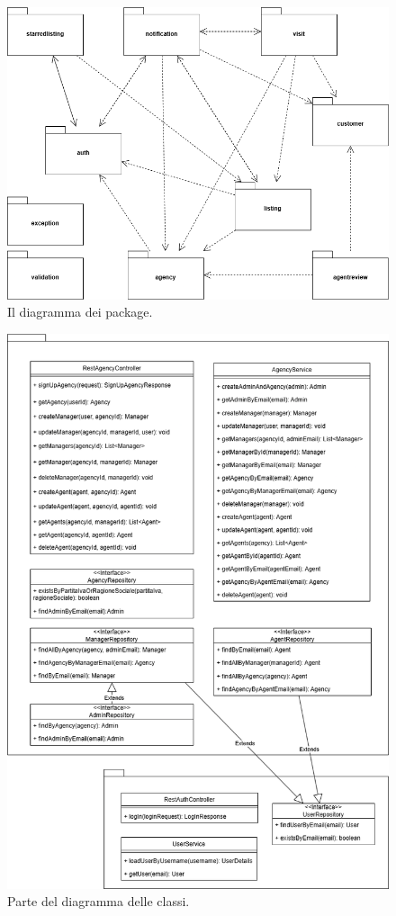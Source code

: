 \begin{figure}[H]
    \centering
    \includegraphics[width=\textwidth]{assets/diagrams/class-diagram/package.png}
    \caption{Il diagramma dei package.}
    \label{fig:Diagramma dei package}
\end{figure}

\begin{figure}[H]
    \centering
    \includegraphics[width=\textwidth]{assets/diagrams/class-diagram/class-diagram-1.png}
    \caption{Parte del diagramma delle classi.}
    \label{fig:Parte 1 del diagramma delle classi}
\end{figure}

